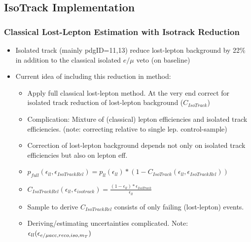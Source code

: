\documentclass{beamer}
\begin{document}
\subsection{IsoTrack Implementation}
\begin{frame}
 \frametitle{Classical Lost-Lepton Estimation with Isotrack Reduction}
 \begin{itemize}
  \item Isolated track (mainly pdgID=11,13) reduce lost-lepton background by 22\% in addition to the classical isolated $e/\mu$ veto (on baseline)
  \item Current idea of including this reduction in method:
  \begin{itemize}
   \item Apply full classical lost-lepton method. At the very end correct for isolated track reduction of lost-lepton background ($C_{IsoTrack}$)
   \item Complication: Mixture of (classical) lepton efficiencies and isolated track efficiencies. (note: correcting relative to single lep. control-sample)
   \item Correction of lost-lepton background depends not only on isolated track efficiencies but also on lepton eff.
   \item $p_{full}(\epsilon_{ll},\epsilon_{IsoTrackRel}) = p_{ll}(\epsilon_{ll}) * (1-C_{IsoTrack}(\epsilon_{ll},\epsilon_{IsoTrackRel}))$
   \item $C_{IsoTrackRel}(\epsilon_{ll},\epsilon_{isotrack}) = \frac{(1-\epsilon_{ll}) * \epsilon_{IsoTrack}}{\epsilon_{ll}}$ %
   \item Sample to derive $C_{IsoTrackRel}$ consists of only failing (lost-lepton) events.
   \item Deriving/estimating uncertainties complicated. Note: $\epsilon_{ll}(\epsilon_{e/\mu acc,reco,iso,m_{T}})$
  \end{itemize}

 \end{itemize}

\end{frame}
\end{document}
